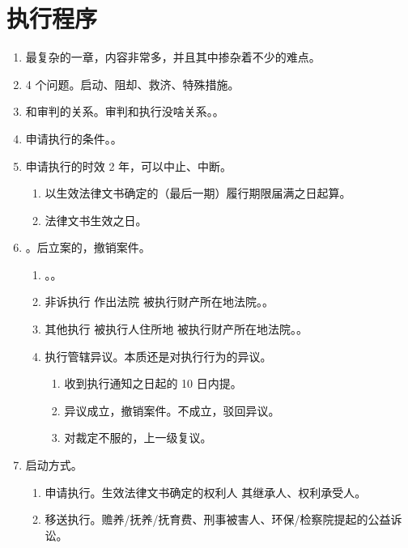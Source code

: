 \section{执行程序}
\begin{enumerate}
  \item 最复杂的一章，内容非常多，并且其中掺杂着不少的难点。
  \item 4 个问题。启动、阻却、救济、特殊措施。
  \item 和审判的关系。审判和执行没啥关系。。
  \item 申请执行的条件。。
  \item 申请执行的时效 2 年，可以中止、中断。
        \begin{enumerate}
          \item 以生效法律文书确定的（最后一期）履行期限届满之日起算。
          \item 法律文书生效之日。
        \end{enumerate}
  \item {}。后立案的，撤销案件。
        \begin{enumerate}
          \item {}。。
          \item 非诉执行 \yjt 作出法院 \hz 被执行财产所在地法院。。
          \item 其他执行 \yjt 被执行人住所地 \hz 被执行财产所在地法院。。
          \item 执行管辖异议。本质还是对执行行为的异议。
                \begin{enumerate}
                  \item 收到执行通知之日起的 10 日内提。
                  \item 异议成立，撤销案件。不成立，驳回异议。
                  \item 对裁定不服的，上一级复议。
                \end{enumerate}
        \end{enumerate}
  \item 启动方式。
        \begin{enumerate}
          \item 申请执行。生效法律文书确定的权利人 \hz 其继承人、权利承受人。
          \item 移送执行。赡养/抚养/抚育费、刑事被害人、环保/检察院提起的公益诉讼。
        \end{enumerate}

\end{enumerate}
